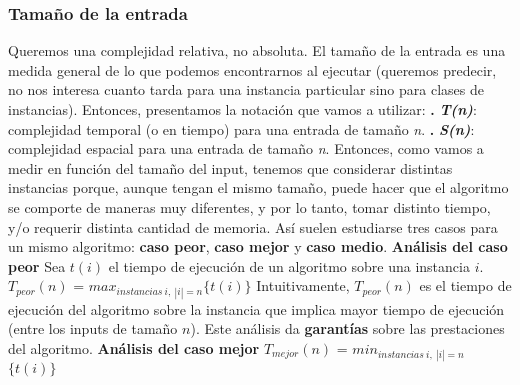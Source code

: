 \documentclass[10pt,a4paper]{article}
\begin{document}
\subsubsection{Tamaño de la entrada}

Queremos una complejidad relativa, no absoluta. El tamaño de la entrada es una medida general de lo que podemos encontrarnos al ejecutar (queremos predecir, no nos interesa cuanto tarda para una instancia particular sino para clases de instancias).
\newline
\newline
Entonces, presentamos la notación que vamos a utilizar:
\newline
\newline
\textbf{.} \textbf{\textit{T(n)}}: complejidad temporal (o en tiempo) para una entrada de tamaño \textit{n}.
\newline
\newline
\textbf{.} \textbf{\textit{S(n)}}: complejidad espacial para una entrada de tamaño \textit{n}.
\newline
\newline
Entonces, como vamos a medir en función del tamaño del input, tenemos que considerar distintas instancias porque, aunque tengan el mismo tamaño, puede hacer que el algoritmo se comporte de maneras muy diferentes, y por lo tanto, tomar distinto tiempo, y/o requerir distinta cantidad de memoria.
\newline
\newline
Así suelen estudiarse tres casos para un mismo algoritmo: \textbf{caso peor}, \textbf{caso mejor} y \textbf{caso medio}.
\newline
\newline
\textbf{Análisis del caso peor}
\newline
\newline
Sea $t(i)$ el tiempo de ejecución de un algoritmo sobre una instancia $i$.
\newline
\newline
$T_{peor}(n)$ = $max_{instancias~i,~|i|=n}$$\{t(i)\}$
\newline
\newline
Intuitivamente, $T_{peor}(n)$ es el tiempo de ejecución del algoritmo sobre la instancia que implica mayor tiempo de ejecución (entre los inputs de tamaño $n$).
\newline
\newline
Este análisis da \textbf{garantías} sobre las prestaciones del algoritmo.
\newline
\newline
\textbf{Análisis del caso mejor}
\newline
\newline
$T_{mejor}(n)$ = $min_{instancias~i,~|i|=n}$$\{t(i)\}$
\end{document}
